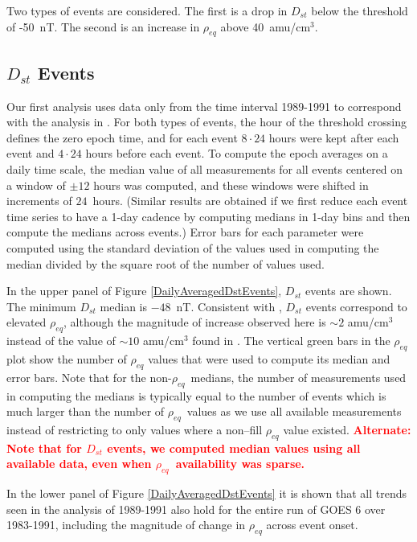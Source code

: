 \documentclass[10pt,twocolumn]{article}
\newcommand{\vinote}[1]{\textcolor{red}{\textbf{#1}}} %
\newcommand{\req}{\ensuremath{\rho_{eq}}}
\newcommand{\inote}[1]{\textcolor{blue}{\textbf{#1}}} %
\def\note#1\par{\textcolor{blue}{\textbf{#1}}\\}
\begin{document}
Two types of events are considered. The first is a drop in $D_{st}$ below the threshold of -50~nT.  The second is an increase in $\rho_{eq}$ above 40~amu/cm$^3$.

\subsection{$D_{st}$ Events}

Our first analysis uses data only from the time interval 1989-1991 to correspond with the analysis in \cite{Takahashi2010}. For both types of events, the hour of the threshold crossing defines the zero epoch time, and for each event $8\cdot24$ hours were kept after each event and $4\cdot24$ hours before each event.  To compute the epoch averages on a daily time scale, the median value of all measurements for all events centered on a window of $\pm 12$ hours was computed, and these windows were shifted in increments of $24$~hours. (Similar results are obtained if we first reduce each event time series to have a 1-day cadence by computing medians in 1-day bins and then compute the medians across events.)  Error bars for each parameter were computed using the standard deviation of the values used in computing the median divided by the square root of the number of values used.

In the upper panel of Figure \ref{DailyAveragedDstEvents}, $D_{st}$ events are shown.  The minimum $D_{st}$ median is $-48$~nT.  Consistent with \cite{Takahashi2010}, $D_{st}$ events correspond to elevated $\rho_{eq}$, although the magnitude of increase observed here is $\sim 2$ amu/cm$^3$ instead of the value of $\sim 10$ amu/cm$^3$ found in \cite{Takahashi2010}.  The vertical green bars in the $\rho_{eq}$ plot show the number of $\rho_{eq}$ values that were used to compute its median and error bars.  Note that for the non-\req\ medians, the number of measurements used in computing the medians is typically equal to the number of events which is much larger than the number of \req\ values as we use all available measurements instead of restricting to only values where a non--fill $\rho_{eq}$ value existed. \vinote{Alternate: Note that for $D_{st}$ events, we computed median values using all available data, even when \req\ availability was sparse.}

In the lower panel of Figure \ref{DailyAveragedDstEvents} it is shown that all trends seen in the analysis of 1989-1991 also hold for the entire run of GOES 6 over 1983-1991, including the magnitude of change in $\rho_{eq}$ across event onset.
\end{document}
